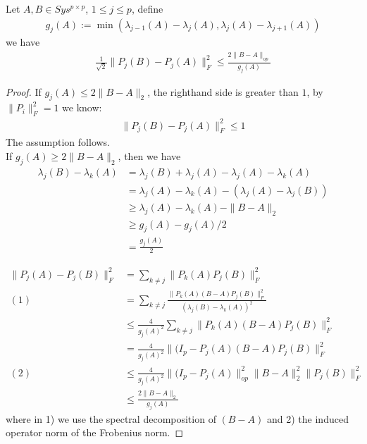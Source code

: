 \begin{theorem}
Let $A, B \in Sys^{p \times p}$, $1 \le j \le p$, define
\begin{align*}
	g_j(A):= \min(\lambda_{j-1}(A) - \lambda_j(A), \lambda_j(A) - \lambda_{j+1}(A))
\end{align*}
we have
\begin{align*}
	\frac{1}{\sqrt{2}}\|P_j(B) - P_j(A)\|^2_F \le \frac{2\|B - A\|_{op}}{g_j(A)}
\end{align*}
\end{theorem}
\begin{proof}
If $g_j(A) \le 2\|B-A\|_2$, the righthand side is greater than $1$, by $\|P_i\|_F^2 = 1$ we know:
\begin{align*}
	\|P_j(B) - P_j(A)\|_F^2 \le 1
\end{align*}
The assumption follows. \\
If $g_j(A) \ge 2\|B-A\|_2$, then we have
\begin{align*}
	\lambda_j(B) - \lambda_k(A) &= \lambda_j(B) + \lambda_j(A) - \lambda_j(A) - \lambda_k(A)\\
	&=\lambda_j(A) - \lambda_k(A)  -(\lambda_j(A) - \lambda_j(B))\\
	&\ge \lambda_j(A) -\lambda_k(A) - \|B - A\|_2\\
	&\ge g_j(A) - g_j(A) \slash 2 \\
	&= \frac{g_j(A)}{2}
\end{align*}

\begin{align*}
	\|P_j(A) - P_j(B)\|_F^2 &= \sum_{k \neq j} \|P_k(A)P_j(B)\|_F^2\\
	(1)&= \sum_{k \neq j}\frac{\|P_k(A)(B - A)P_j(B)\|_F^2}{(\lambda_j(B) - \lambda_k(A))^2}\\
	&\le \frac{4}{g_j(A)^2}\sum_{k \neq j}\|P_k(A)(B - A)P_j(B)\|_F^2\\
	&= \frac{4}{g_j(A)^2}\|(I_p - P_j(A) (B - A)P_j(B) \|_F^2\\
	(2)&\le \frac{4}{g_j(A)^2}\|(I_p - P_j(A)\|_{op}^2 \|B - A\|_2^2\|P_j(B)\|_F^2\\
	&\le \frac{2\|B - A\|_2}{g_j(A)} 
\end{align*}
	where in 1) we use the spectral decomposition of $(B - A)$ and 2) the induced operator norm of the Frobenius norm.
\end{proof}

